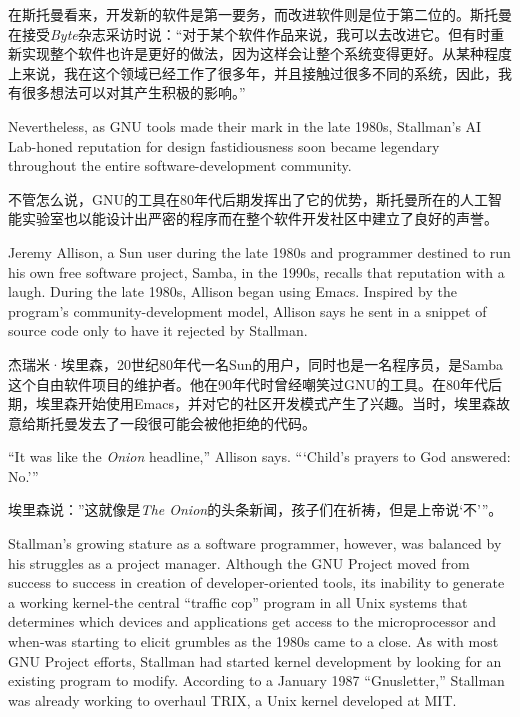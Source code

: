 \ifdefined\chs
在斯托曼看来，开发新的软件是第一要务，而改进软件则是位于第二位的。斯托曼在接受\textit{Byte}杂志采访时说：``对于某个软件作品来说，我可以去改进它。但有时重新实现整个软件也许是更好的做法，因为这样会让整个系统变得更好。从某种程度上来说，我在这个领域已经工作了很多年，并且接触过很多不同的系统，因此，我有很多想法可以对其产生积极的影响。''
\fi

\ifdefined\eng
Nevertheless, as GNU tools made their mark in the late 1980s, Stallman's AI Lab-honed reputation for design fastidiousness soon became legendary throughout the entire software-development community.
\fi

\ifdefined\chs
不管怎么说，GNU的工具在80年代后期发挥出了它的优势，斯托曼所在的人工智能实验室也以能设计出严密的程序而在整个软件开发社区中建立了良好的声誉。
\fi

\ifdefined\eng
Jeremy Allison, a Sun user during the late 1980s and programmer destined to run his own free software project, Samba, in the 1990s, recalls that reputation with a laugh. During the late 1980s, Allison began using Emacs. Inspired by the program's community-development model, Allison says he sent in a snippet of source code only to have it rejected by Stallman.
\fi

\ifdefined\chs
杰瑞米·埃里森，20世纪80年代一名Sun的用户，同时也是一名程序员，是Samba这个自由软件项目的维护者。他在90年代时曾经嘲笑过GNU的工具。在80年代后期，埃里森开始使用Emacs，并对它的社区开发模式产生了兴趣。当时，埃里森故意给斯托曼发去了一段很可能会被他拒绝的代码。
\fi

\ifdefined\eng
``It was like the \textit{Onion} headline,'' Allison says. ``\hspace{0.01in}`Child's prayers to God answered: No.'\hspace{0.01in}''
\fi

\ifdefined\chs
埃里森说：''这就像是\textit{The Onion}的头条新闻，孩子们在祈祷，但是上帝说`不'''。
\fi

\ifdefined\eng
Stallman's growing stature as a software programmer, however, was balanced by his struggles as a project manager. Although the GNU Project moved from success to success in creation of developer-oriented tools, its inability to generate a working kernel-the central ``traffic cop'' program in all Unix systems that determines which devices and applications get access to the microprocessor and when-was starting to elicit grumbles as the 1980s came to a close. As with most GNU Project efforts, Stallman had started kernel development by looking for an existing program to modify. According to a January 1987 ``Gnusletter,'' Stallman was already working to overhaul TRIX, a Unix kernel developed at MIT.
\fi

